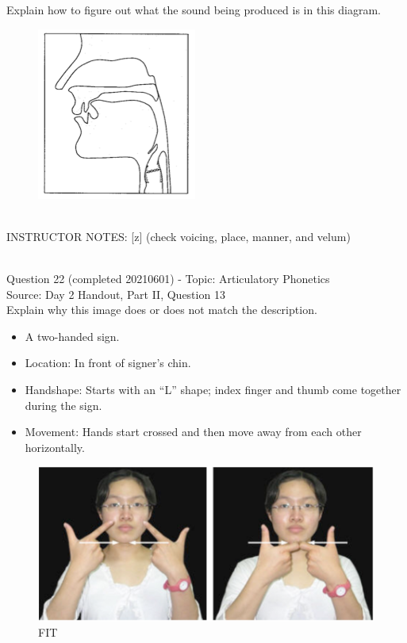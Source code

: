 \documentclass[12pt]{article}
\begin{document}
Explain how to figure out what the sound being produced is in this diagram.\\

\begin{figure}[H]
\includegraphics{../images/sagittal_z.png}
\end{figure}

~\\
INSTRUCTOR NOTES: [z] (check voicing, place, manner, and velum)


~\\

{\large Question 22} (completed 20210601) - Topic: Articulatory Phonetics\\
Source: Day 2 Handout, Part II, Question 13\\

Explain why this image does or does not match the description.\\

\begin{itemize} \item A two-handed sign. \item Location: In front of signer’s chin. \item Handshape: Starts with an “L” shape; index finger and thumb come together during the sign. \item Movement: Hands start crossed and then move away from each other horizontally. \end{itemize}

\begin{figure}[H]
\includegraphics{../images/taiwansign_fit.png}
\caption{FIT}
\end{figure}
\end{document}
